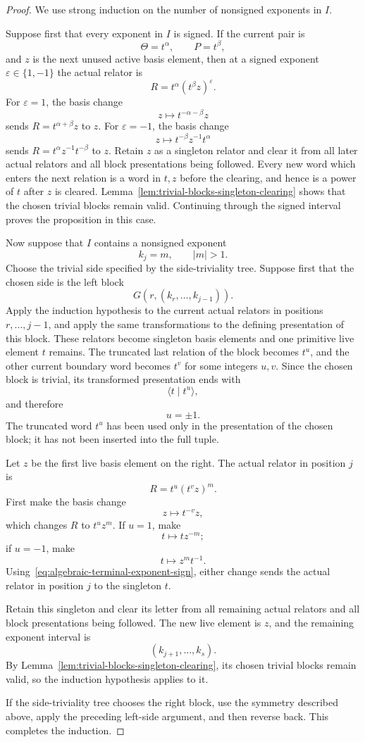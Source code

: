 \documentclass{article}
\begin{document}
\begin{proof}
We use strong induction on the number of nonsigned exponents in $I$.

Suppose first that every exponent in $I$ is signed.  If the current pair is
\[
 \Theta=t^{\alpha},\qquad P=t^{\beta},
\]
and $z$ is the next unused active basis element, then at a signed exponent
$\varepsilon\in\{1,-1\}$ the actual relator is
\[
 R=t^{\alpha}(t^{\beta}z)^{\varepsilon}.
\]
For $\varepsilon=1$, the basis change
\[
 z\longmapsto t^{-\alpha-\beta}z
\]
sends $R=t^{\alpha+\beta}z$ to $z$.  For $\varepsilon=-1$, the basis change
\[
 z\longmapsto t^{-\beta}z^{-1}t^{\alpha}
\]
sends $R=t^{\alpha}z^{-1}t^{-\beta}$ to $z$.  Retain $z$ as a singleton
relator and clear it from all later actual relators and all block
presentations being followed.  Every new word which enters the next
relation is a word in $t,z$ before the clearing, and hence is a power of $t$
after $z$ is cleared.  Lemma~\ref{lem:trivial-blocks-singleton-clearing} shows that
the chosen trivial blocks remain valid.  Continuing through the signed
interval proves the proposition in this case.

Now suppose that $I$ contains a nonsigned exponent
\[
 k_j=m,\qquad |m|>1.
\]
Choose the trivial side specified by the side-triviality tree.  Suppose first
that the chosen side is the left block
\[
 G(r,(k_r,\ldots,k_{j-1})).
\]
Apply the induction hypothesis to the current actual relators in positions
$r,\ldots,j-1$, and apply the same transformations to the defining
presentation of this block.  These relators become singleton basis elements
and one primitive live element $t$ remains.  The truncated last relation of
the block becomes $t^u$, and the other current boundary word becomes $t^v$
for some integers $u,v$.  Since the chosen block is trivial, its transformed
presentation ends with
\[
 \langle t\mid t^u\rangle,
\]
and therefore
\begin{equation}
 u=\pm1.
 \label{eq:algebraic-terminal-exponent-sign}
\end{equation}
The truncated word $t^u$ has been used only in the presentation of the
chosen block; it has not been inserted into the full tuple.

Let $z$ be the first live basis element on the right.  The actual relator in
position $j$ is
\[
 R=t^u(t^vz)^m.
\]
First make the basis change
\[
 z\longmapsto t^{-v}z,
\]
which changes $R$ to $t^uz^m$.  If $u=1$, make
\[
 t\longmapsto tz^{-m};
\]
if $u=-1$, make
\[
 t\longmapsto z^m t^{-1}.
\]
Using~\eqref{eq:algebraic-terminal-exponent-sign}, either change sends the
actual relator in position $j$ to the singleton $t$.

Retain this singleton and clear its letter from all remaining actual
relators and all block presentations being followed.  The new live element
is $z$, and the remaining exponent interval is
\[
 (k_{j+1},\ldots,k_s).
\]
By Lemma~\ref{lem:trivial-blocks-singleton-clearing}, its chosen trivial blocks remain
valid, so the induction hypothesis applies to it.

If the side-triviality tree chooses the right block, use the symmetry
described above, apply the preceding left-side argument, and then reverse back.  This completes the induction.
\end{proof}
\end{document}
